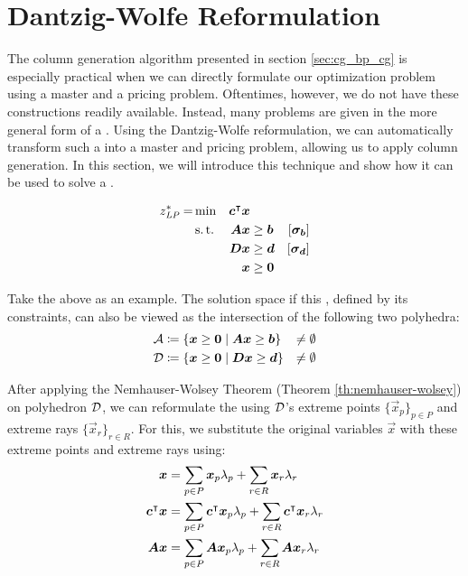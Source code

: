 \section{Dantzig-Wolfe Reformulation}\label{sec:cg_bp_dwr}
The column generation algorithm presented in section \ref{sec:cg_bp_cg} is especially practical when we can directly formulate our optimization problem using a master and a pricing problem. Oftentimes, however, we do not have these constructions readily available. Instead, many problems are given in the more general form of a \LP{}. Using the Dantzig-Wolfe reformulation, we can automatically transform such a \LP{} into a master and pricing problem, allowing us to apply column generation. In this section, we will introduce this technique and show how it can be used to solve a \LP{}.

\begin{equation}
\begin{aligned}
z^*_{\textit{LP}}{} = &\min & {\bm{c}}^\intercal {\bm{x}} & & & \\
&\operatorname{s.t.} & {\bm{A}} {\bm{x}} & \geq {\bm{b}} & \left[{\bm{\sigma}}_{\bm{b}}\right] & \\
&& {\bm{D}} {\bm{x}} & \geq {\bm{d}} & \left[{\bm{\sigma}}_{\bm{d}}\right] & \\
&& {\bm{x}} & \geq {\bm{0}}
\end{aligned}
\end{equation}

Take the above \LP{} as an example. The solution space if this \LP{}, defined by its constraints, can also be viewed as the intersection of the following two polyhedra:
\begin{equation}
\begin{aligned}
\mathcal{A} &\coloneqq \left\{ {\bm{x}} \geq {\bm{0}} \mid {\bm{A}} {\bm{x}} \geq {\bm{b}} \right\} &\neq \emptyset \\
\mathcal{D} &\coloneqq \left\{ {\bm{x}} \geq {\bm{0}} \mid {\bm{D}} {\bm{x}} \geq {\bm{d}} \right\} &\neq \emptyset
\end{aligned}
\end{equation}

After applying the Nemhauser-Wolsey Theorem (Theorem \ref{th:nemhauser-wolsey}) on polyhedron $\mathcal{D}$, we can reformulate the \LP{} using $\mathcal{D}$'s extreme points $\{\vec{x}_p\}_{p \in P}$ and extreme rays $\{\vec{x}_r\}_{r \in R}$. For this, we substitute the original variables $\vec{x}$ with these extreme points and extreme rays using:
\begin{equation}
\begin{aligned}
{\bm{x}} &= \sum_{p \in P} {\bm{x}}_p \lambda_p + \sum_{r \in R} {\bm{x}}_r \lambda_r \\
{\bm{c}}^\intercal {\bm{x}} &= \sum_{p \in P} {\bm{c}}^\intercal {\bm{x}}_p \lambda_p + \sum_{r \in R} {\bm{c}}^\intercal {\bm{x}}_r \lambda_r \\
{\bm{A}} {\bm{x}} &= \sum_{p \in P} {\bm{A}} {\bm{x}}_p \lambda_p + \sum_{r \in R} {\bm{A}} {\bm{x}}_r \lambda_r
\end{aligned}
\end{equation}

